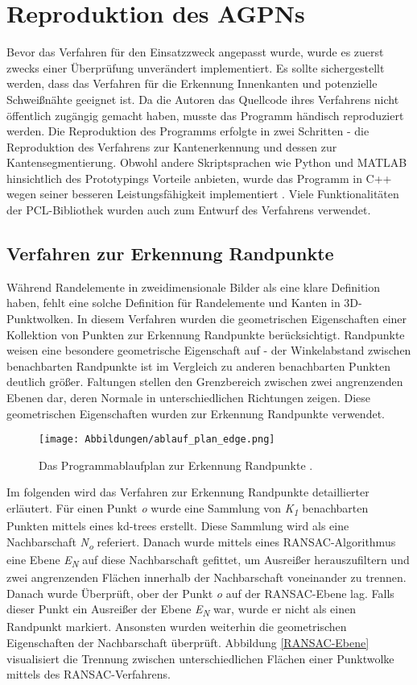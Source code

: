 \section{Reproduktion des AGPNs}
Bevor das Verfahren für den Einsatzzweck angepasst wurde, wurde es zuerst zwecks einer Überprüfung unverändert implementiert. Es sollte sichergestellt werden, dass das Verfahren für die Erkennung Innenkanten und potenzielle Schweißnähte geeignet ist. Da die Autoren das Quellcode ihres Verfahrens nicht öffentlich zugängig gemacht haben, musste das Programm händisch reproduziert werden. Die Reproduktion des Programms erfolgte in zwei Schritten - die Reproduktion des Verfahrens zur Kantenerkennung und dessen zur Kantensegmentierung. Obwohl andere Skriptsprachen wie Python und MATLAB hinsichtlich des Prototypings Vorteile anbieten, wurde das Programm in C++ wegen seiner besseren Leistungsfähigkeit implementiert \autocite{svensson_performance_2021}. Viele Funktionalitäten der PCL-Bibliothek \autocite{rusu_3d_2011} wurden auch zum Entwurf des Verfahrens verwendet.

\subsection{Verfahren zur Erkennung Randpunkte}
Während Randelemente in zweidimensionale Bilder als eine klare Definition haben, fehlt eine solche Definition für Randelemente und Kanten in 3D-Punktwolken. In diesem Verfahren wurden die geometrischen Eigenschaften einer Kollektion von Punkten zur Erkennung Randpunkte berücksichtigt. Randpunkte weisen eine besondere geometrische Eigenschaft auf - der Winkelabstand zwischen benachbarten Randpunkte ist im Vergleich zu anderen benachbarten Punkten deutlich größer. Faltungen stellen den Grenzbereich zwischen zwei angrenzenden Ebenen dar, deren Normale in unterschiedlichen Richtungen zeigen. Diese geometrischen Eigenschaften wurden zur Erkennung Randpunkte verwendet. \autocite[1-2]{ni_edge_2016}

\begin{figure}[h]
	\texttt{[image: Abbildungen/ablauf\_plan\_edge.png]}
	\centering
	\caption{Das Programmablaufplan zur Erkennung Randpunkte \autocite{ni_edge_2016}.}
	\label{flow_chart}
\end{figure}

Im folgenden wird das Verfahren zur Erkennung Randpunkte detaillierter erläutert. Für einen Punkt \textit{o} wurde eine Sammlung von \textit{K\textsubscript{1}} benachbarten Punkten mittels eines kd-trees erstellt. Diese Sammlung wird als eine Nachbarschaft \textit{N\textsubscript{o}} referiert. Danach wurde mittels eines RANSAC-Algorithmus eine Ebene \textit{E\textsubscript{N}} auf diese Nachbarschaft gefittet, um Ausreißer herauszufiltern und zwei angrenzenden Flächen innerhalb der Nachbarschaft voneinander zu trennen. Danach wurde Überprüft, ober der Punkt \textit{o} auf der RANSAC-Ebene lag. Falls dieser Punkt ein Ausreißer der Ebene \textit{E\textsubscript{N}} war, wurde er nicht als einen Randpunkt markiert. Ansonsten wurden weiterhin die geometrischen Eigenschaften der Nachbarschaft überprüft. Abbildung \ref{RANSAC-Ebene} visualisiert die Trennung zwischen unterschiedlichen Flächen einer Punktwolke mittels des RANSAC-Verfahrens. 

